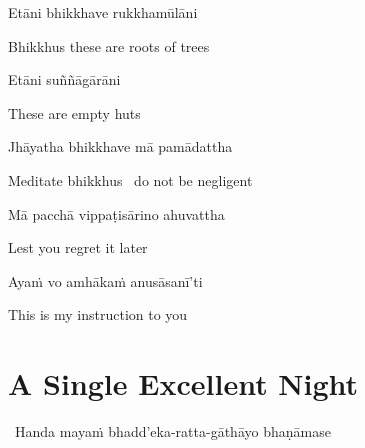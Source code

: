 \begin{verses}
  Etāni bhikkhave rukkhamūlāni
\end{verses}

\begin{english}
  Bhikkhus these are roots of trees
\end{english}

\begin{verses}
  Etāni suññāgārāni
\end{verses}

\begin{english}
  These are empty huts
\end{english}

\begin{verses}
  Jhāyatha bhikkhave mā pamādattha
\end{verses}

\begin{english}
  Meditate bhikkhus \breathmark\ do not be negligent
\end{english}

\begin{verses}
  Mā pacchā vippaṭisārino ahuvattha
\end{verses}

\begin{english}
  Lest you regret it later
\end{english}

\begin{verses}
  Ayaṁ vo amhākaṁ anusāsanī'ti
\end{verses}

\begin{english}
  This is my instruction to you
\end{english}

\suttaRef{[MN 19]}


\section{A Single Excellent Night}
\label{single-excellent-night}

\begin{leader}
  \anglebracketleft\ \hspace{-0.5mm}Handa mayaṁ bhadd'eka-ratta-gāthāyo bhaṇāmase \hspace{-0.5mm}\anglebracketright\
\end{leader}

